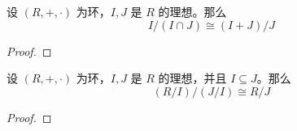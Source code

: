 \begin{theorem}
    设 $(R,+,\cdot)$ 为环，$I,J$ 是 $R$ 的理想。那么
    \[
        I/(I\cap J)  \cong  (I+J)/J
    \]
    \label{thm:second_isomorphism_theorem_for_rings}
\end{theorem}
\begin{proof}

\end{proof}

\begin{theorem}
    设 $(R,+,\cdot)$ 为环，$I,J$ 是 $R$ 的理想，并且 $I\subseteq J$。那么
    \[
        (R/I)/(J/I) \cong R/J
    \]
    \label{thm:third_isomorphism_theorem_for_rings}
\end{theorem}
\begin{proof}

\end{proof}

\newpage